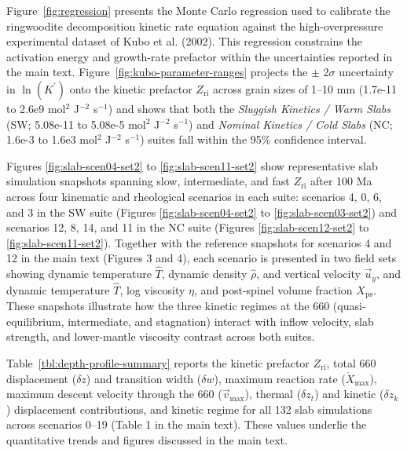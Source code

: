 \documentclass[final]{agujournal2019}
\begin{document}
Figure~\ref{fig:regression} presents the Monte Carlo regression used to
calibrate the ringwoodite decomposition kinetic rate equation against
the high-overpressure experimental dataset of Kubo et al. (2002). This
regression constrains the activation energy and growth-rate prefactor
within the uncertainties reported in the main text.
Figure~\ref{fig:kubo-parameter-ranges} projects the \(\pm\) 2\(\sigma\)
uncertainty in \(\ln(K^{\prime})\) onto the kinetic prefactor
\(Z_\mathrm{ri}\) across grain sizes of 1--10 mm (1.7e-11 to 2.6e9
mol\(^2\) J\(^{-2}\) s\(^{-1}\)) and shows that both the \emph{Sluggish
Kinetics / Warm Slabs} (SW; 5.08e-11 to 5.08e-5 mol\(^2\) J\(^{-2}\)
s\(^{-1}\)) and \emph{Nominal Kinetics / Cold Slabs} (NC; 1.6e-3 to
1.6e3 mol\(^2\) J\(^{-2}\) s\(^{-1}\)) suites fall within the 95\%
confidence interval.

Figures \ref{fig:slab-scen04-set2} to \ref{fig:slab-scen11-set2} show
representative slab simulation snapshots spanning slow, intermediate,
and fast \(Z_\mathrm{ri}\) after 100 Ma across four kinematic and
rheological scenarios in each suite: scenarios 4, 0, 6, and 3 in the SW
suite (Figures \ref{fig:slab-scen04-set2} to \ref{fig:slab-scen03-set2})
and scenarios 12, 8, 14, and 11 in the NC suite (Figures
\ref{fig:slab-scen12-set2} to \ref{fig:slab-scen11-set2}). Together with
the reference snapshots for scenarios 4 and 12 in the main text (Figures
3 and 4), each scenario is presented in two field sets showing dynamic
temperature \(\hat{T}\), dynamic density \(\hat{\rho}\), and vertical
velocity \(\vec{u}_y\), and dynamic temperature \(\hat{T}\), log
viscosity \(\eta\), and post-spinel volume fraction \(X_\mathrm{ps}\).
These snapshots illustrate how the three kinetic regimes at the 660
(quasi-equilibrium, intermediate, and stagnation) interact with inflow
velocity, slab strength, and lower-mantle viscosity contrast across both
suites.

Table~\ref{tbl:depth-profile-summary} reports the kinetic prefactor
\(Z_\mathrm{ri}\), total 660 displacement (\(\delta z\)) and transition
width (\(\delta w\)), maximum reaction rate (\(\dot{X}_\mathrm{max}\)),
maximum descent velocity through the 660 (\(\vec{v}_\mathrm{max}\)),
thermal (\(\delta z_t\)) and kinetic (\(\delta z_k\)) displacement
contributions, and kinetic regime for all 132 slab simulations across
scenarios 0--19 (Table 1 in the main text). These values underlie the
quantitative trends and figures discussed in the main text.

\clearpage
\end{document}
